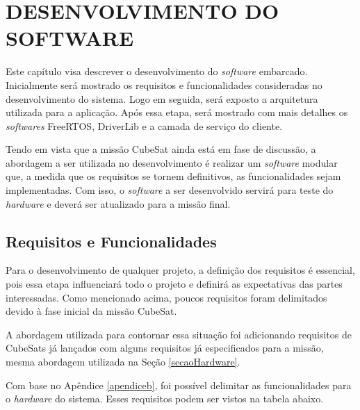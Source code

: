 \chapter[DESENVOLVIMENTO DO SOFTWARE]{DESENVOLVIMENTO DO SOFTWARE}

Este capítulo visa descrever o desenvolvimento do \textit{software} embarcado. Inicialmente será mostrado os requisitos e funcionalidades consideradas no desenvolvimento do sistema. Logo em seguida, será exposto a arquitetura utilizada para a aplicação. Após essa etapa, será mostrado com mais detalhes os \textit{softwares} FreeRTOS, DriverLib e a camada de serviço do cliente. 

Tendo em vista que a missão CubeSat ainda está em fase de discussão, a abordagem a ser utilizada no desenvolvimento é realizar um \textit{software} modular que, a medida que os requisitos se tornem definitivos, as funcionalidades sejam implementadas. Com isso, o \textit{software} a ser desenvolvido servirá para teste do \textit{hardware} e deverá ser atualizado para a missão final.

\section{Requisitos e Funcionalidades}

Para o desenvolvimento de qualquer projeto, a definição dos requisitos é essencial, pois essa etapa influenciará todo o projeto e definirá as expectativas das partes interessadas. Como mencionado acima, poucos requisitos foram delimitados devido à fase inicial da missão CubeSat.

A abordagem utilizada para contornar essa situação foi adicionando requisitos de CubeSats já lançados com alguns requisitos já especificados para a missão, mesma abordagem utilizada na Seção \ref{secaoHardware}.

Com base no Apêndice \ref{apendiceb}, foi possível delimitar as funcionalidades para o \textit{hardware} do sistema. Esses requisitos podem ser vistos na tabela abaixo.

